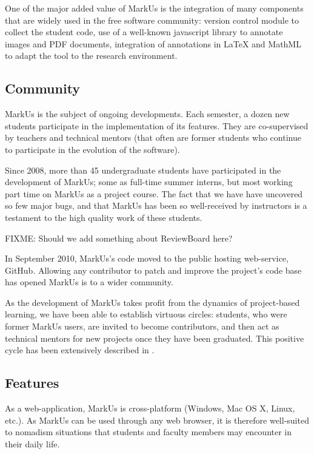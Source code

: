 \documentclass[twocolumn,10pt]{asme2e}
\begin{document}
One of the major added value of MarkUs is the integration of many components that are widely used in the free software community: version control module to collect the student code, use of a well-known javascript library to annotate images and PDF documents, integration of annotations in LaTeX and MathML to adapt the tool to the research environment. 

\subsection*{Community}
MarkUs is the subject of ongoing developments. Each semester, a dozen  new students participate in the implementation of its features. They are co-supervised by teachers and technical mentors (that often are former students who continue to participate in the evolution of the software).

Since 2008, more than 45 undergraduate students have participated in the development of MarkUs; some as full-time summer interns, but most working part time on MarkUs as a project course. The fact that we have have uncovered so few major bugs, and that MarkUs has been so well-received by instructors is a testament to the high quality work of these students.

FIXME: Should we add something about ReviewBoard here?

In September 2010, MarkUs's code moved to the public hosting web-service,
GitHub. Allowing any contributor to patch and improve the project's code base has opened MarkUs is to a wider community.

As the development of MarkUs takes profit from the dynamics of project-based learning, we have been able to establish virtuous circles: students, who were former MarkUs users, are invited to become contributors, and then act as technical mentors for new projects once they have been graduated. This positive cycle has been extensively described in \cite{magnin-qpes-2011}.

\subsection*{Features}
\label{features}

As a web-application, MarkUs is cross-platform (Windows, Mac OS X, Linux,
etc.). As MarkUs can be used through any web browser, it is therefore
well-suited to nomadism situations that students and faculty members may
encounter in their daily life.
\end{document}
